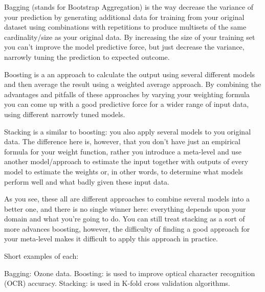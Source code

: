 

Bagging (stands for Bootstrap Aggregation) is the way decrease the variance of your prediction by generating additional data for training from your original dataset using combinations with repetitions to produce multisets of the same cardinality/size as your original data. By increasing the size of your training set you can't improve the model predictive force, but just decrease the variance, narrowly tuning the prediction to expected outcome.

Boosting is a an approach to calculate the output using several different models and then average the result using a weighted average approach. By combining the advantages and pitfalls of these approaches by varying your weighting formula you can come up with a good predictive force for a wider range of input data, using different narrowly tuned models.

Stacking is a similar to boosting: you also apply several models to you original data. The difference here is, however, that you don't have just an empirical formula for your weight function, rather you introduce a meta-level and use another model/approach to estimate the input together with outputs of every model to estimate the weights or, in other words, to determine what models perform well and what badly given these input data.

As you see, these all are different approaches to combine several models into a better one, and there is no single winner here: everything depends upon your domain and what you're going to do. You can still treat stacking as a sort of more advances boosting, however, the difficulty of finding a good approach for your meta-level makes it difficult to apply this approach in practice.

Short examples of each:

Bagging: Ozone data.
Boosting: is used to improve optical character recognition (OCR) accuracy.
Stacking: is used in K-fold cross validation algorithms.
